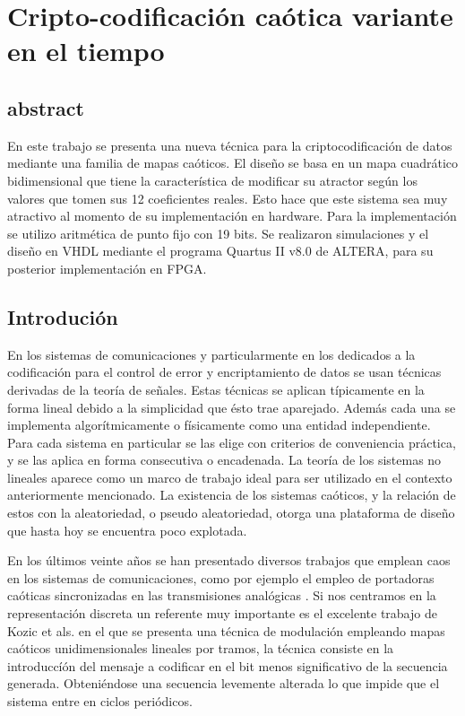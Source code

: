 \section{Cripto-codificación caótica variante en el tiempo}

\subsection{abstract}
En este trabajo se presenta una nueva técnica para la
criptocodificación de datos mediante una familia de mapas
caóticos. El diseño se basa en un mapa cuadrático bidimensional
que tiene la característica de modificar su atractor según los
valores que tomen sus 12 coeficientes reales. Esto hace que este
sistema sea muy atractivo al momento de su implementación en
hardware. Para la implementación se utilizo aritmética de punto
fijo con 19 bits. Se realizaron simulaciones y el diseño en VHDL
mediante el programa Quartus II v8.0 de ALTERA, para su posterior
implementación en FPGA.

\subsection{Introdución}


En los sistemas de comunicaciones y particularmente en los
dedicados a la codificación para el control de error y
encriptamiento de datos se usan técnicas derivadas de la teoría de
señales. Estas técnicas se aplican típicamente en la forma lineal
debido a la simplicidad que ésto trae aparejado. Además cada una se
implementa algorítmicamente o físicamente como una entidad
independiente. Para cada sistema en particular se las elige
con criterios de conveniencia práctica, y se las aplica en forma
consecutiva o encadenada. La teoría de los sistemas no lineales
\cite{Strogatz1994,Lasota1994} aparece como un marco de trabajo
ideal para ser utilizado en el contexto anteriormente mencionado.
La existencia de los sistemas caóticos, y la relación de estos con
la aleatoriedad, o pseudo aleatoriedad, otorga una plataforma de
diseño que hasta hoy se encuentra poco explotada.

En los últimos veinte años se han presentado diversos trabajos que
emplean caos en los sistemas de comunicaciones, como por ejemplo
el empleo de portadoras caóticas sincronizadas en las
transmisiones analógicas \cite{Kocarev1995,Hidalgo2001}. Si nos
centramos en la representación discreta un referente muy
importante es el excelente trabajo de Kozic et als.
\cite{Kozic2006A,Kozic2006B} en el que se presenta una técnica de
modulación empleando mapas caóticos unidimensionales lineales por
tramos, la técnica consiste en la introduccíón del mensaje a
codificar en el bit menos significativo de la secuencia generada.
Obteniéndose una secuencia levemente alterada lo que impide que el
sistema entre en ciclos periódicos.

